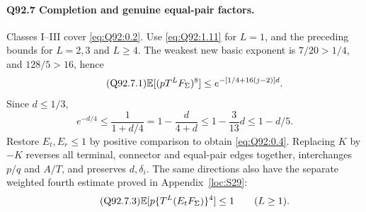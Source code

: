 \paragraph{Q92.7 Completion and genuine equal-pair factors.}
Classes I--III cover \eqref{eq:Q92:0.2}. Use
\eqref{eq:Q92:1.11} for \(L=\allowbreak 1\), and the preceding bounds for
\(L=\allowbreak 2,\allowbreak 3\) and \(L\ge\allowbreak 4\). The weakest new basic exponent is
\(7/20>\allowbreak 1/4\), and \(128/5>\allowbreak 16\), hence
\begin{equation}\tag{Q92.7.1}\label{eq:Q92:7.1}
\mathbb E[(pT^LF_\Sigma)^8]\le e^{-[1/4+16(j-2)]d}.
\end{equation}
Since \(d\le\allowbreak 1/3\),
\begin{equation}\tag{Q92.7.2}\label{eq:Q92:7.2}
e^{-d/4}\le\frac1{1+d/4}
=1-\frac d{4+d}\le1-\frac3{13}d\le1-d/5.
\end{equation}
Restore \(E_t,\allowbreak E_r\le\allowbreak 1\) by positive comparison to obtain
\eqref{eq:Q92:0.4}. Replacing \(K\) by \(-K\) reverses all terminal,
connector and equal-pair edges together, interchanges \(p/q\) and
\(A/T\), and preserves \(d,\allowbreak \delta_i\).
The same directions also have the separate weighted fourth estimate
proved in Appendix~\ref{loc:S29}:
\begin{equation}\tag{Q92.7.3}\label{eq:Q92:7.3}
\mathbb E[p\{T^L(E_tF_\Sigma)\}^4]\le1\qquad(L\ge1).
\end{equation}
